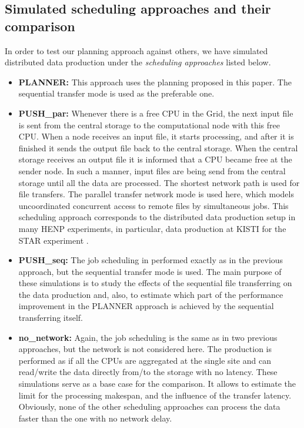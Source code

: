 \documentclass{svjour3}                     %
\begin{document}
\subsection{Simulated scheduling approaches and their comparison}
In order to test our planning approach against others, we have simulated distributed data production under the \textit{scheduling approaches} listed below. 
\begin{itemize}
\label{scenarios}
\item \textbf{PLANNER:}  This approach uses the planning proposed in this paper. The sequential transfer mode is used as the preferable one. 
\item \textbf{PUSH\_par:} Whenever there is a free CPU in the Grid, the next input file is sent from the central storage to the computational node with this free CPU. When a node receives an input file, it starts processing, and after it is finished it sends the output file back to the central storage. When the central storage receives an output file it is informed that a CPU became free at the sender node. In such a manner, input files are being send from the central storage until all the data are processed. The shortest network path is used for file transfers. The parallel transfer network mode is used here, which models uncoordinated concurrent access to remote files by simultaneous jobs. This scheduling approach corresponds to the distributed data production setup in many HENP experiments, in particular, data production at KISTI for the STAR experiment \cite{KISTI-production}. 
\item \textbf{PUSH\_seq:} The job scheduling in performed exactly as in the previous approach, but the sequential transfer mode is used. The main purpose of these simulations is to study the effects of the sequential file transferring on the data production and, also, to estimate which part of the performance improvement in the PLANNER approach is achieved by the sequential transferring itself.
\item \textbf{no\_network:} Again, the job scheduling is the same as in two previous approaches, but the network is not considered here. The production is performed as if all the CPUs are aggregated at the single site and can read/write the data directly from/to the storage with no latency. These simulations serve as a base case for the comparison. It allows to estimate the limit for the processing makespan, and the influence of the transfer latency. Obviously, none of the other scheduling approaches can process the data faster than the one with no network delay.
\end{itemize}
\end{document}
